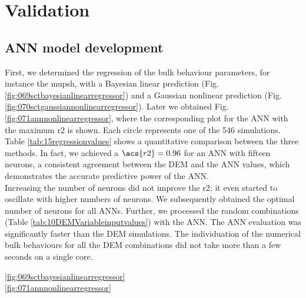 
\chapter{Validation}
\label{cap:validation}

\section{ANN model development}
\label{sec:annmodeldev}



First, we determined the regression of the bulk behaviour parameters, for
instance the \acs{mupsh}, 
with a Bayesian linear prediction (Fig.
\ref{fig:069sctbayesianlinearregressor}) and a Gaussian nonlinear prediction
(Fig.  \ref{fig:070sctgaussiannonlinearregressor}). 
Later we obtained Fig.
\ref{fig:071annnonlinearregressor}, where the corresponding plot for the \acs{ANN} with the maximum \acs{r2} is shown. 
Each circle represents one of the 546 simulations.
Table \ref{tab:15regressionvalues} shows a quantitative comparison between the
three methods. 
In fact, 
we achieved a $\acs{r2} = 0.96$ for an \acs{ANN} with fifteen neurons,
a consistent agreement between the 
\acs{DEM} and the \acs{ANN} values, which demonstrates the accurate predictive power of
the \acs{ANN}.\\ 
Increasing the number of neurons did not improve the \acs{r2}; it even started to
oscillate with higher numbers of neurons.
We subsequently obtained the optimal number of neurons for all \acs{ANNs}.
Further, we processed the random combinations (Table
\ref{tab:10DEMVariableinputvalues}) with the \acs{ANN}.
The \acs{ANN} evaluation was significantly faster than the \acs{DEM} simulations. The
individuation of the numerical bulk behaviours for all the \acs{DEM} combinations
did not take more than a few seconds on a single core.


	  \ref{fig:069sctbayesianlinearregressor}\\

	  \ref{fig:071annnonlinearregressor}\\

